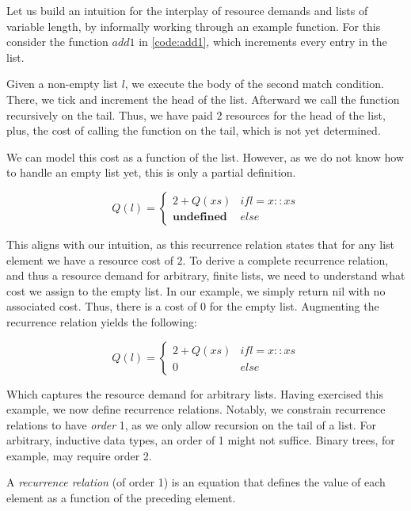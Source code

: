 Let us build an intuition for the interplay of resource demands and lists of variable length, by informally working through an example function. For this consider the function \(add1\) in \cref{code:add1}, which increments every entry in the list.

Given a non-empty list \(l\), we execute the body of the second match condition. There, we tick and increment the head of the list. Afterward we call the function recursively on the tail. Thus, we have paid \(2\) resources for the head of the list, plus, the cost of calling the function on the tail, which is not yet determined.

We can model this cost as a function of the list. However, as we do not know how to handle an empty list yet, this is only a partial definition.

\[
   Q(l) = \begin{cases*}
      2 + Q(xs)            & if l = x :: xs\\
      \textbf{undefined}   & else
   \end{cases*}
\]

This aligns with our intuition, as this recurrence relation states that for any list element we have a resource cost of \(2\). To derive a complete recurrence relation, and thus a resource demand for arbitrary, finite lists, we need to understand what cost we assign to the empty list. In our example, we simply return nil with no associated cost. Thus, there is a cost of \(0\) for the empty list. Augmenting the recurrence relation yields the following:

\[
   Q(l) = \begin{cases*}
      2 + Q(xs)            & if l = x :: xs\\
      0                    & else
   \end{cases*}
\]

Which captures the resource demand for arbitrary lists. Having exercised this example, we now define recurrence relations. Notably, we constrain recurrence relations to have \emph{order} 1, as we only allow recursion on the tail of a list. For arbitrary, inductive data types, an order of 1 might not suffice. Binary trees, for example, may require order 2.

\begin{definition}\label{def:recurrence-relation}
   A \emph{recurrence relation} (of order 1) is an equation that defines the value of each element as a function of the preceding element.
\end{definition}

